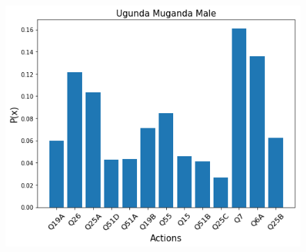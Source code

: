 {\begin{figure}[t!]
\begin{minipage}{0.32\textwidth}
		\label{fig:ugundamugandatopdown}
	\end{minipage}\hfill
	\begin{minipage}{0.32\textwidth}
		\includegraphics[width=\linewidth]{Images/UgundaMugandaMaleTopDownHDM.png}
		\label{fig:ugundamugandamaletopdown}
	\end{minipage}
	

\end{figure}}
